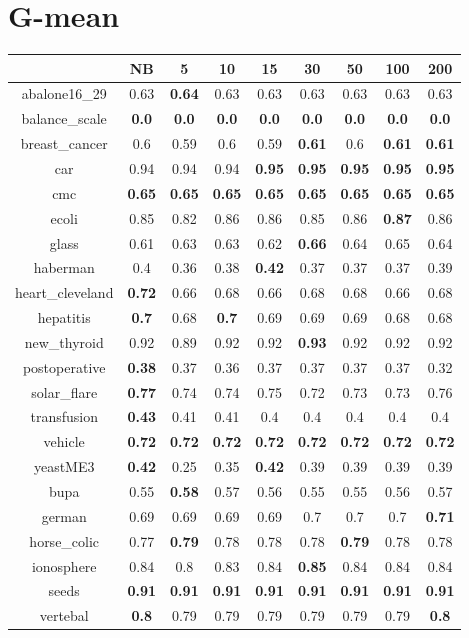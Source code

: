 \documentclass{article}%
\begin{document}
%
\section*{G{-}mean}%
\begin{tabular}{c|cccccccc}%
\hline%
&NB&5&10&15&30&50&100&200\\%
\hline%
abalone16\_29&0.63&\textbf{0.64}&0.63&0.63&0.63&0.63&0.63&0.63\\%
\hline%
balance\_scale&\textbf{0.0}&\textbf{0.0}&\textbf{0.0}&\textbf{0.0}&\textbf{0.0}&\textbf{0.0}&\textbf{0.0}&\textbf{0.0}\\%
\hline%
breast\_cancer&0.6&0.59&0.6&0.59&\textbf{0.61}&0.6&\textbf{0.61}&\textbf{0.61}\\%
\hline%
car&0.94&0.94&0.94&\textbf{0.95}&\textbf{0.95}&\textbf{0.95}&\textbf{0.95}&\textbf{0.95}\\%
\hline%
cmc&\textbf{0.65}&\textbf{0.65}&\textbf{0.65}&\textbf{0.65}&\textbf{0.65}&\textbf{0.65}&\textbf{0.65}&\textbf{0.65}\\%
\hline%
ecoli&0.85&0.82&0.86&0.86&0.85&0.86&\textbf{0.87}&0.86\\%
\hline%
glass&0.61&0.63&0.63&0.62&\textbf{0.66}&0.64&0.65&0.64\\%
\hline%
haberman&0.4&0.36&0.38&\textbf{0.42}&0.37&0.37&0.37&0.39\\%
\hline%
heart\_cleveland&\textbf{0.72}&0.66&0.68&0.66&0.68&0.68&0.66&0.68\\%
\hline%
hepatitis&\textbf{0.7}&0.68&\textbf{0.7}&0.69&0.69&0.69&0.68&0.68\\%
\hline%
new\_thyroid&0.92&0.89&0.92&0.92&\textbf{0.93}&0.92&0.92&0.92\\%
\hline%
postoperative&\textbf{0.38}&0.37&0.36&0.37&0.37&0.37&0.37&0.32\\%
\hline%
solar\_flare&\textbf{0.77}&0.74&0.74&0.75&0.72&0.73&0.73&0.76\\%
\hline%
transfusion&\textbf{0.43}&0.41&0.41&0.4&0.4&0.4&0.4&0.4\\%
\hline%
vehicle&\textbf{0.72}&\textbf{0.72}&\textbf{0.72}&\textbf{0.72}&\textbf{0.72}&\textbf{0.72}&\textbf{0.72}&\textbf{0.72}\\%
\hline%
yeastME3&\textbf{0.42}&0.25&0.35&\textbf{0.42}&0.39&0.39&0.39&0.39\\%
\hline%
bupa&0.55&\textbf{0.58}&0.57&0.56&0.55&0.55&0.56&0.57\\%
\hline%
german&0.69&0.69&0.69&0.69&0.7&0.7&0.7&\textbf{0.71}\\%
\hline%
horse\_colic&0.77&\textbf{0.79}&0.78&0.78&0.78&\textbf{0.79}&0.78&0.78\\%
\hline%
ionosphere&0.84&0.8&0.83&0.84&\textbf{0.85}&0.84&0.84&0.84\\%
\hline%
seeds&\textbf{0.91}&\textbf{0.91}&\textbf{0.91}&\textbf{0.91}&\textbf{0.91}&\textbf{0.91}&\textbf{0.91}&\textbf{0.91}\\%
\hline%
vertebal&\textbf{0.8}&0.79&0.79&0.79&0.79&0.79&0.79&\textbf{0.8}\\%
\hline%
\end{tabular}

%
\end{document}
